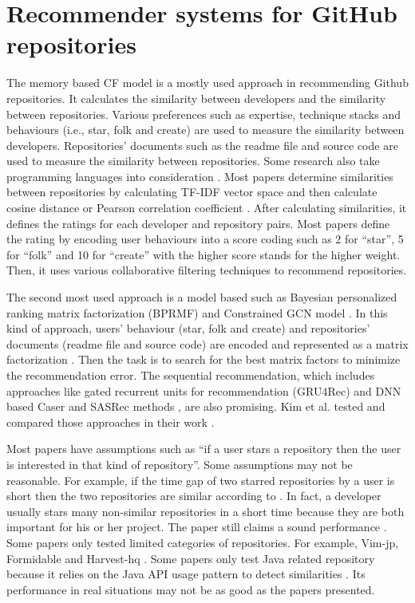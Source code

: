 \documentclass[11pt,twoside]{report}
\begin{document}
\section{Recommender systems for GitHub repositories}
The memory based CF model is a mostly used approach in recommending Github repositories. It calculates the similarity between developers and the similarity between repositories. Various preferences such as expertise, technique stacks and behaviours (i.e., star, folk and create) are used to measure the similarity between developers. Repositories' documents such as the readme file and source code are used to measure the similarity between repositories. Some research also take programming languages into consideration \cite{inka_open_2018, sun_personalized_2018}. Most papers determine similarities between repositories by calculating TF-IDF vector space and then calculate cosine distance or Pearson correlation coefficient \cite{mansur_review_nodate, kim_sequential_2021}. After calculating similarities, it defines the ratings for each developer and repository pairs. Most papers define the rating by encoding user behaviours into a score coding such as 2 for “star”, 5 for “folk” and 10 for “create” with the higher score stands for the higher weight. Then, it uses various collaborative filtering techniques to recommend repositories.

The second most used approach is a model based such as Bayesian personalized ranking matrix factorization (BPRMF) \cite{jiang_open_2017} and Constrained GCN model \cite{shao_paper2repo_2020}. In this kind of approach, users’ behaviour (star, folk and create) and repositories’ documents (readme file and source code) are encoded and represented as a matrix factorization \cite{jiang_open_2017}. Then the task is to search for the best matrix factors to minimize the recommendation error. The sequential recommendation, which includes approaches like gated recurrent units for recommendation (GRU4Rec) and DNN based Caser and SASRec methods \cite{kim_sequential_2021}, are also promising. Kim et al. \cite{kim_sequential_2021} tested and compared those approaches in their work \cite{kim_sequential_2021}.

Most papers have assumptions such as “if a user stars a repository then the user is interested in that kind of repository”. Some assumptions may not be reasonable. For example, if the time gap of two starred repositories by a user is short then the two repositories are similar according to \cite{zhang_detecting_2017}. In fact, a developer usually stars many non-similar repositories in a short time because they are both important for his or her project. The paper still claims a sound performance \cite{zhang_detecting_2017}. Some papers only tested limited categories of repositories. For example, Vim-jp, Formidable and Harvest-hq \cite{sun_personalized_2018, xu_repersp_2017}. Some papers only test Java related repository because it relies on the Java API usage pattern to detect similarities \cite{zhang_detecting_2017}. Its performance in real situations may not be as good as the papers presented.
\end{document}
